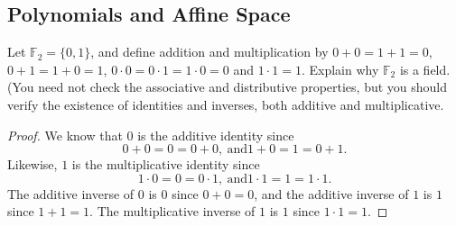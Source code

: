 \subsection{Polynomials and Affine Space}


\begin{exercise}{1}
Let $\mathbb{F}_2 = \{0,1\}$, and define addition and multiplication by $0+0 = 1+1 = 0$, $0+1 = 1+0 = 1$, $0\cdot 0 = 0\cdot 1 = 1\cdot 0 = 0$ and $1\cdot 1 = 1$. Explain why $\mathbb{F}_2$ is a field. (You need not check the associative and distributive properties, but you should verify the existence of identities and inverses, both additive and multiplicative.
\end{exercise}
\begin{proof}
    We know that $0$ is the additive identity since
    $$0 + 0 = 0 = 0+0,~\text{and} 1+0 = 1 = 0+1.$$
    Likewise, $1$ is the multiplicative identity since
     $$1\cdot 0 = 0 = 0\cdot 1,~\text{and} 1\cdot 1 = 1 = 1\cdot 1.$$
   The additive inverse of $0$ is $0$ since $0+0=0$, and the additive inverse of $1$ is $1$ since $1+1=1$. The multiplicative inverse of $1$ is $1$ since $1\cdot 1 = 1$.
\end{proof}


